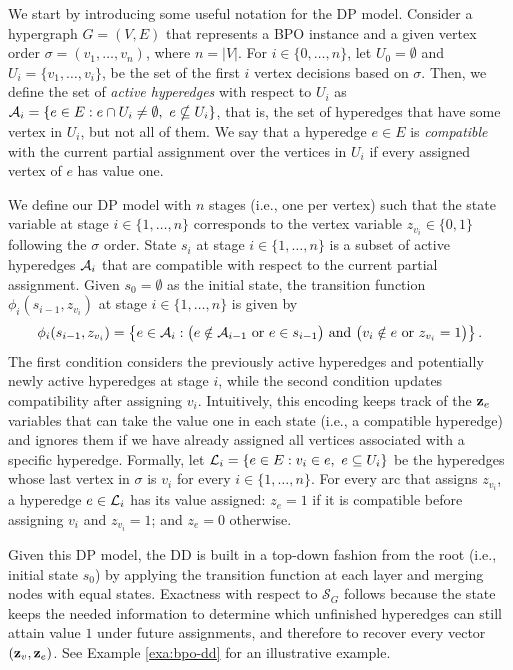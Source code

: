 We start by introducing some useful notation for the DP model. Consider a hypergraph $G=(V,E)$ that represents a BPO instance and a given vertex order $\sigma=(v_1,\ldots,v_n)$, where $n = |V|$. For $i\in \{0,\ldots,n\}$, let $U_0=\emptyset$ and $U_i=\{v_1,\ldots,v_i\}$, be the set of the first $i$ vertex decisions based on $\sigma$.  Then, we define the set of \textit{active hyperedges} with respect to $U_i$ as
$\A_i=\{e\in E : e\cap U_i\neq\emptyset,\ e\nsubseteq U_i\}$, that is, the set of hyperedges that have some vertex in $U_i$, but not all of them. We say that a hyperedge $e\in E$ is \emph{compatible} with the current partial assignment over the vertices in $U_i$ if every assigned vertex of $e$ has value one. 

We define our DP model with $n$ stages (i.e., one per vertex) such that the state variable at stage $i \in \{1,\ldots,n\}$ corresponds to the vertex variable $z_{v_i}\in\{0,1\}$ following the $\sigma$ order. State $s_i$ at stage $i \in \{1,\ldots,n\}$ is a subset of active hyperedges $\mathcal{A}_i$ that are compatible with respect to the current partial assignment. Given $s_0=\emptyset$ as the initial state, the transition function $\phi_i(s_{i-1},z_{v_i})$ at stage $i \in \{1,\ldots,n\}$ is given by
%
\[
\phi_i(s_{i-1},z_{v_i})=
\left\{
e\in\mathcal{A}_i :
\bigl(e\notin\mathcal{A}_{i-1}\ \text{or}\ e\in s_{i-1}\bigr)
\text{ and }
\bigl(v_i\notin e\ \text{or}\ z_{v_i}=1\bigr)
\right\}.
\]
The first condition considers the previously active hyperedges and potentially newly active hyperedges at stage $i$, while the second condition updates compatibility after assigning $v_i$. Intuitively, this encoding keeps track of the $\mathbf{z}_e$ variables that can take the value one in each state (i.e., a compatible hyperedge) and ignores them if we have already assigned all vertices associated with a specific hyperedge. Formally, let
$\Ll_i=\{e\in E : v_i\in e,\ e\subseteq U_i\}$ be the hyperedges whose last vertex in  $\sigma$ is $v_i$ for every $i \in \{1,\ldots,n\}$. For every arc that assigns $z_{v_i}$, a hyperedge $e \in \mathcal{L}_i$ has its value assigned: $z_e = 1$ if it is compatible before assigning $v_i$ and $z_{v_i}=1$; and $z_e = 0$ otherwise.

Given this DP model, the DD is built in a top-down fashion from the root (i.e., initial state $s_0$) by applying the transition function at each layer
and merging nodes with equal states. Exactness with respect to $\mathcal{S}_G$
follows because the state keeps the needed information to determine which unfinished hyperedges can still attain value $1$ under future assignments, and therefore to recover every vector $(\mathbf{z}_v,\mathbf{z}_e)$. See Example \ref{exa:bpo-dd} for an illustrative example.

